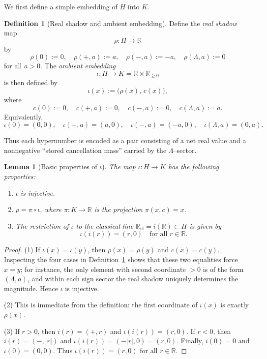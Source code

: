\documentclass[11pt]{amsart}
\numberwithin{equation}{section}
\newtheorem{lemma}[theorem]{Lemma}
\theoremstyle{definition}
\newtheorem{definition}[theorem]{Definition}
\theoremstyle{remark}
\newcommand{\R}{\mathbb{R}}
\newcommand{\Rc}{\mathbb{R}_{\mathrm{cl}}} %
\newcommand{\Hnum}{H}                      %
\newcommand{\Kamb}{K}                      %
\newcommand{\iemb}{i}                      %
\begin{document}
We first define a simple embedding of $\Hnum$ into $\Kamb$.

\begin{definition}[Real shadow and ambient embedding]\label{def:real-shadow-embedding}
Define the \emph{real shadow} map
\[
  \rho:\Hnum\longrightarrow\R
\]
by
\[
  \rho(0) := 0,\quad
  \rho(+,a) := a,\quad
  \rho(-,a) := -a,\quad
  \rho(\Lambda,a) := 0
\]
for all $a>0$.  The \emph{ambient embedding}
\[
  \iota:\Hnum\longrightarrow\Kamb=\R\times\R_{\ge0}
\]
is then defined by
\[
  \iota(x) := \bigl(\rho(x),\, c(x)\bigr),
\]
where
\[
  c(0) := 0,\quad
  c(+,a) := 0,\quad
  c(-,a) := 0,\quad
  c(\Lambda,a) := a.
\]
Equivalently,
\[
  \iota(0) = (0,0),\quad
  \iota(+,a) = (a,0),\quad
  \iota(-,a) = (-a,0),\quad
  \iota(\Lambda,a) = (0,a).
\]
\end{definition}

Thus each hypernumber is encoded as a pair consisting of a net real
value and a nonnegative ``stored cancellation mass'' carried by the
$\Lambda$--sector.

\begin{lemma}[Basic properties of $\iota$]\label{lem:iota-basic}
The map $\iota:\Hnum\to\Kamb$ has the following properties:
\begin{enumerate}
  \item $\iota$ is injective.
  \item $\rho = \pi\circ\iota$, where $\pi:\Kamb\to\R$ is the
        projection $\pi(x,c)=x$.
  \item The restriction of $\iota$ to the classical line
        $\Rc=\iemb(\R)\subset\Hnum$ is given by
  \[
    \iota(\iemb(r)) = (r,0)
    \quad\text{for all }r\in\R.
  \]
\end{enumerate}
\end{lemma}

\begin{proof}
(1) If $\iota(x)=\iota(y)$, then $\rho(x)=\rho(y)$ and $c(x)=c(y)$.
Inspecting the four cases in Definition~\ref{def:real-shadow-embedding}
shows that these two equalities force $x=y$; for instance, the only
element with second coordinate $>0$ is of the form $(\Lambda,a)$, and
within each sign sector the real shadow uniquely determines the
magnitude.  Hence $\iota$ is injective.

(2) This is immediate from the definition: the first coordinate of
$\iota(x)$ is exactly $\rho(x)$.

(3) If $r>0$, then $\iemb(r)=(+,r)$ and $\iota(\iemb(r))=(r,0)$.  If
$r<0$, then $\iemb(r)=(-,|r|)$ and
$\iota(\iemb(r))=(-|r|,0)=(r,0)$.  Finally, $\iemb(0)=0$ and
$\iota(0)=(0,0)$.  Thus $\iota(\iemb(r))=(r,0)$ for all $r\in\R$.
\end{proof}
\end{document}
